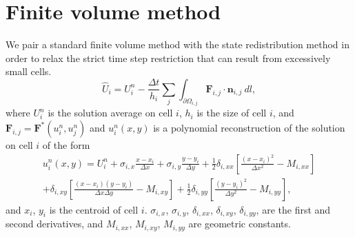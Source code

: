
\section{Finite volume method}
We pair a standard finite volume method with the state redistribution method in order to relax the strict time step restriction that can result from excessively small cells. 
\begin{equation} 
\hat U_i = U^n_i - \frac{\Delta t}{h_i}\sum_{j} \int_{\partial \Omega_{i,j}} \mathbf{F}_{i,j} \cdot \mathbf{n}_{i,j}~dl,\label{eq:scheme}
\end{equation}
where $U^n_i$ is the solution average on cell $i$, $h_i$ is the size of cell $i$, and $\mathbf{F}_{i,j} = \mathbf{F}^*(u^n_{i},u^n_{j})$ and $u^n_{i}(x,y)$ is a polynomial reconstruction of the solution on cell $i$ of the form
\begin{equation}\label{eq:uhat}
\begin{aligned}
	    u^n_i(x,y) = U^n_{i} +  \sigma_{i,x}\frac{x- x_i}{\Delta x} +   \sigma_{i,y}\frac{y- y_i}{\Delta y} + \frac{1}{2} \delta_{i, xx}\left[ \frac{(x -  x_i)^2 }{\Delta x^2} -  M_{i,xx}\right]\\
	    + \delta_{i, xy}\left[ \frac{(x -  x_i) (y -  y_i) }{\Delta x \Delta y} -  M_{i,xy}\right] + \frac{1}{2} \delta_{i, yy}\left[ \frac{(y -  y_i)^2 }{\Delta y^2} -   M_{i,yy}\right],
\end{aligned}
\end{equation}
and $ x_i$, $ y_i$ is the centroid of cell $i$. $ \sigma_{i,x}$, $ \sigma_{i,y}$, $ \delta_{i,xx}$, $ \delta_{i,xy}$, $ \delta_{i,yy}$, are the first and second derivatives, and $  M_{i,xx}$, $ M_{i,xy}$,  $ M_{i,yy}$ are geometric constants. 

